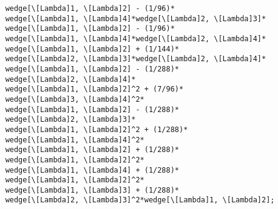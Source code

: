 \documentclass[11pt]{amsart}
\theoremstyle{definition}
\theoremstyle{remark}
\numberwithin{equation}{section}
\begin{document}
\begin{lstlisting}
    wedge[\[Lambda]1, \[Lambda]2] - (1/96)*
    wedge[\[Lambda]1, \[Lambda]4]*wedge[\[Lambda]2, \[Lambda]3]*
    wedge[\[Lambda]1, \[Lambda]2] - (1/96)*
    wedge[\[Lambda]1, \[Lambda]4]*wedge[\[Lambda]2, \[Lambda]4]*
    wedge[\[Lambda]1, \[Lambda]2] + (1/144)*
    wedge[\[Lambda]2, \[Lambda]3]*wedge[\[Lambda]2, \[Lambda]4]*
    wedge[\[Lambda]1, \[Lambda]2] - (1/288)*
    wedge[\[Lambda]2, \[Lambda]4]*
    wedge[\[Lambda]1, \[Lambda]2]^2 + (7/96)*
    wedge[\[Lambda]3, \[Lambda]4]^2*
    wedge[\[Lambda]1, \[Lambda]2] - (1/288)*
    wedge[\[Lambda]2, \[Lambda]3]*
    wedge[\[Lambda]1, \[Lambda]2]^2 + (1/288)*
    wedge[\[Lambda]1, \[Lambda]4]^2*
    wedge[\[Lambda]1, \[Lambda]2] + (1/288)*
    wedge[\[Lambda]1, \[Lambda]2]^2*
    wedge[\[Lambda]1, \[Lambda]4] + (1/288)*
    wedge[\[Lambda]1, \[Lambda]2]^2*
    wedge[\[Lambda]1, \[Lambda]3] + (1/288)*
    wedge[\[Lambda]2, \[Lambda]3]^2*wedge[\[Lambda]1, \[Lambda]2];
\end{lstlisting}


\end{document}
